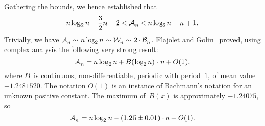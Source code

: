 Gathering the bounds, we hence established that
\begin{equation*}
n\log_2 n - \frac{3}{2}n + 2 < \mathcal{A}_{n}^{} < n\log_2 n - n + 1.
\end{equation*}
Trivially, we have \(\mathcal{A}_{n}^{} \sim n\log_2 n \sim \mathcal{W}_{n}^{} \sim 2 \cdot
\mathcal{B}_{n}^{}\).  Flajolet and Golin~\cite{FlajoletGolin:1994} proved, using
complex analysis the following very strong result:
\begin{equation*}
\mathcal{A}_{n}^{} = n\log_2 n + B(\log_2 n) \cdot n + O(1),
\end{equation*}
where \(B\)~is continuous, non\hyp{}differentiable, periodic with
period~\(1\), of mean value \(-1.2481520\). The notation \(O(1)\) is
an instance of Bachmann's notation for an unknown positive
constant. The maximum of~\(B(x)\) is approximately \(-1.24075\), so
\begin{equation*}
\belowdisplayskip=0pt
\M{}{n} = n\log_2 n - (1.25 \pm 0.01) \cdot n + O(1).
\end{equation*}
